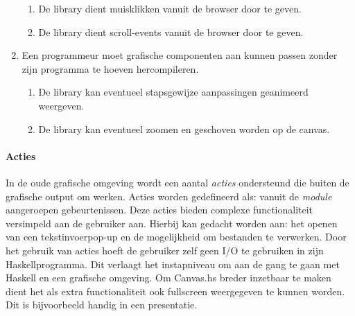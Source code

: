 \begin{enumerate}[label={R\arabic*}]
\begin{enumerate}[label={R\arabic{enumi}.\arabic*}]
		\item \label{req:event:mouse} De library dient muisklikken vanuit de browser door te geven.
		\item \label{req:event:scroll} De library dient scroll-events vanuit de browser door te geven.
	\end{enumerate}
	\item Een programmeur moet grafische componenten aan kunnen passen zonder zijn programma te hoeven hercompileren.
	\begin{enumerate}[label={R\arabic{enumi}.\arabic*}]
		\item \label{req:action:animate} De library kan eventueel stapsgewijze aanpassingen geanimeerd weergeven.
		\item \label{req:zoom} De library kan eventueel zoomen en geschoven worden op de canvas.
	\end{enumerate}
	\setcounter{startvalue}{\value{enumi}}
\end{enumerate}

\paragraph{Acties} In de oude grafische omgeving wordt een aantal \emph{acties} ondersteund die buiten de grafische output om werken. Acties worden gedefineerd als: vanuit de \emph{module} aangeroepen gebeurtenissen. Deze acties bieden complexe functionaliteit versimpeld aan de gebruiker aan. Hierbij kan gedacht worden aan: het openen van een tekstinvoerpop-up en de mogelijkheid om bestanden te verwerken. Door het gebruik van acties hoeft de gebruiker zelf geen I/O te gebruiken in zijn Haskellprogramma. Dit verlaagt het instapniveau om aan de gang te gaan met Haskell en een grafische omgeving. Om Canvas.hs breder inzetbaar te maken dient het als extra functionaliteit ook fullscreen weergegeven te kunnen worden. Dit is bijvoorbeeld handig in een presentatie.

